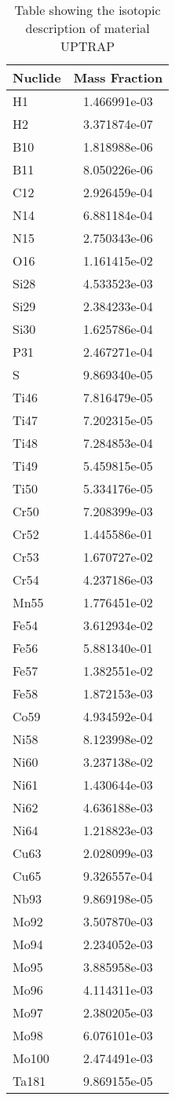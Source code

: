 \begin{centering}
\begin{table}[ht!]
\begin{tabular}{l | c}
\hline
Nuclide & Mass Fraction\\
\hline
H1 & 1.466991e-03\\
H2 & 3.371874e-07\\
B10 & 1.818988e-06\\
B11 & 8.050226e-06\\
C12 & 2.926459e-04\\
N14 & 6.881184e-04\\
N15 & 2.750343e-06\\
O16 & 1.161415e-02\\
Si28 & 4.533523e-03\\
Si29 & 2.384233e-04\\
Si30 & 1.625786e-04\\
P31 & 2.467271e-04\\
S & 9.869340e-05\\
Ti46 & 7.816479e-05\\
Ti47 & 7.202315e-05\\
Ti48 & 7.284853e-04\\
Ti49 & 5.459815e-05\\
Ti50 & 5.334176e-05\\
Cr50 & 7.208399e-03\\
Cr52 & 1.445586e-01\\
Cr53 & 1.670727e-02\\
Cr54 & 4.237186e-03\\
Mn55 & 1.776451e-02\\
Fe54 & 3.612934e-02\\
Fe56 & 5.881340e-01\\
Fe57 & 1.382551e-02\\
Fe58 & 1.872153e-03\\
Co59 & 4.934592e-04\\
Ni58 & 8.123998e-02\\
Ni60 & 3.237138e-02\\
Ni61 & 1.430644e-03\\
Ni62 & 4.636188e-03\\
Ni64 & 1.218823e-03\\
Cu63 & 2.028099e-03\\
Cu65 & 9.326557e-04\\
Nb93 & 9.869198e-05\\
Mo92 & 3.507870e-03\\
Mo94 & 2.234052e-03\\
Mo95 & 3.885958e-03\\
Mo96 & 4.114311e-03\\
Mo97 & 2.380205e-03\\
Mo98 & 6.076101e-03\\
Mo100 & 2.474491e-03\\
Ta181 & 9.869155e-05
\end{tabular}
\caption{Table showing the isotopic description of material UPTRAP}
\label{table:material_UPTRAP}
\end{table}\clearpage


\end{centering}
